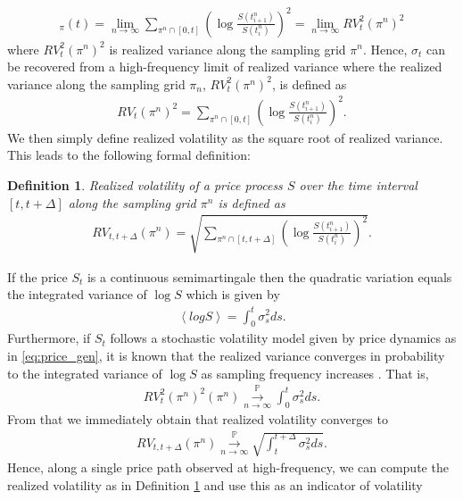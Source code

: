 \documentclass{article}
\newtheorem{definition}{Definition}
\begin{document}
\begin{align*}
[\log S]_\pi (t) = \lim_{n\rightarrow \infty} \sum_{\pi^n \cap [0,t]} \left( \log \frac{S(t^n_{i+1})}{S(t^n_i)}\right)^2 = \lim_{n\rightarrow \infty} RV_t^2(\pi^n)^2
\end{align*}
where $RV_t^2(\pi^n)^2$ is realized variance along the sampling grid $\pi^n$. Hence, $\sigma_t$ can be recovered from a high-frequency limit of realized variance where the realized variance along the sampling grid $\pi_n$, $RV_t^2(\pi^n)^2$, is defined as
\begin{align*}
RV_t(\pi^n)^2 = \sum_{\pi^n \cap [0,t]}\left(\log \frac{S(t^n_{i+1})}{S(t^n_i)}\right)^2.
\end{align*} 
We then simply define realized volatility as the square root of realized variance. This leads to the following formal definition: 
\begin{definition}
Realized volatility of a price process $S$ over the time interval $[t,t+\Delta]$ along the sampling grid $\pi^n$ is defined as 
\begin{align*}
RV_{t,t+\Delta}(\pi^n) = \sqrt{\sum_{\pi^n \cap [t,t+\Delta]}\left(\log \frac{S(t^n_{i+1})}{S(t^n_i)}\right)^2}. 
\end{align*}
\label{def:real_vol}
\end{definition}
If the price $S_t$ is a continuous semimartingale then the quadratic variation equals the integrated variance of $\log S$ which is given by
\begin{align*}
\left\langle log S \right\rangle = \int_0^t \sigma_s^2 ds.
\end{align*}
Furthermore, if $S_t$ follows a stochastic volatility model given by price dynamics as in \eqref{eq:price_gen}, it is known that the realized variance converges in probability to the integrated variance of $\log S$ as sampling frequency increases \cite{jacod2012}. That is,
\begin{align*}
RV_t^2(\pi^n)^2 (\pi^n) \overset{\mathbb{P}}{\underset{n \to \infty}{\longrightarrow}} \int_0^t \sigma_s^2 ds.
\end{align*} 
From that we immediately obtain that realized volatility converges to
\begin{align*}
 RV_{t,t+\Delta} (\pi^n) \overset{\mathbb{P}}{\underset{n \to \infty}{\longrightarrow}} \sqrt{\int^{t+\Delta}_t\sigma^2_s ds}.
\end{align*}
Hence, along a single price path observed at high-frequency, we can compute the realized volatility as in Definition \ref{def:real_vol} and use this as an indicator of volatility
\end{document}
